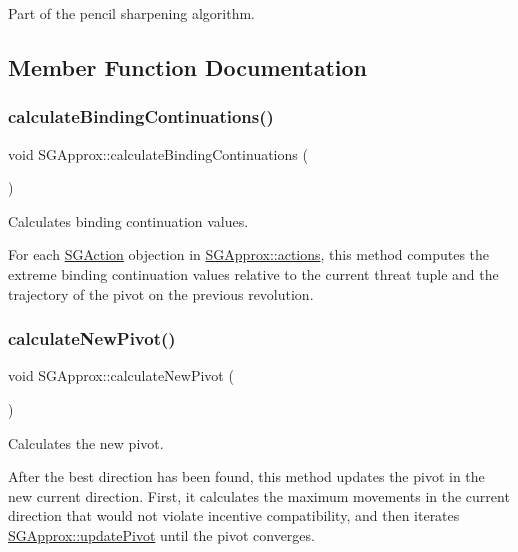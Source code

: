 Part of the pencil sharpening algorithm. 

\subsection{Member Function Documentation}
\mbox{\label{classSGApprox_a22804ad7335d810f6a48a304e618b4f2}} 
\subsubsection{\texorpdfstring{calculate\+Binding\+Continuations()}{calculateBindingContinuations()}}
{\footnotesize\ttfamily void S\+G\+Approx\+::calculate\+Binding\+Continuations (\begin{DoxyParamCaption}{ }\end{DoxyParamCaption})\hspace{0.3cm}{\ttfamily [private]}}



Calculates binding continuation values. 

For each \hyperlink{classSGAction}{S\+G\+Action} objection in \hyperlink{classSGApprox_a0fccecf0f5dbe7e9288e47182f180879}{S\+G\+Approx\+::actions}, this method computes the extreme binding continuation values relative to the current threat tuple and the trajectory of the pivot on the previous revolution. \mbox{\label{classSGApprox_ad545fa06b93fd2241c798cf8661cc092}} 
\subsubsection{\texorpdfstring{calculate\+New\+Pivot()}{calculateNewPivot()}}
{\footnotesize\ttfamily void S\+G\+Approx\+::calculate\+New\+Pivot (\begin{DoxyParamCaption}{ }\end{DoxyParamCaption})\hspace{0.3cm}{\ttfamily [private]}}



Calculates the new pivot. 

After the best direction has been found, this method updates the pivot in the new current direction. First, it calculates the maximum movements in the current direction that would not violate incentive compatibility, and then iterates \hyperlink{classSGApprox_afdc9f582e9b83dc68393da177330561e}{S\+G\+Approx\+::update\+Pivot} until the pivot converges. \mbox{\label{classSGApprox_ae546360183bac3a32bc3fcb57cb81294}} 
